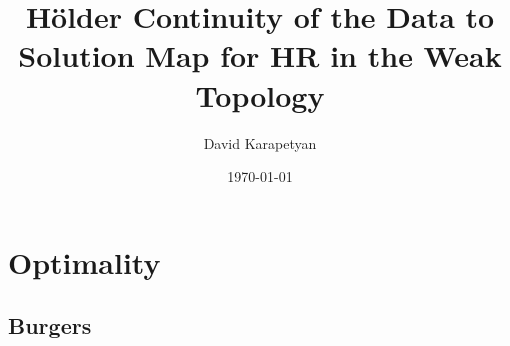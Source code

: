 \documentclass[12pt,reqno]{amsart}
\numberwithin{equation}{section}  %
\numberwithin{figure}{section}
\begin{document}
\title[H\"older Continuity of the Data to Solution Map for HR]{H\"older Continuity of the Data to Solution Map for HR in the
Weak Topology}
\author{David Karapetyan}
\address{Department of Mathematics  \\
    University  of Notre Dame\\
        Notre Dame, IN 46556 }
        \date{\today}
        \maketitle
%
%
%
%
%
%
\section{Optimality} 
\label{sec:optimality}
\subsection{Burgers} 
\label{ssec:burgers-opt}
\end{document}

